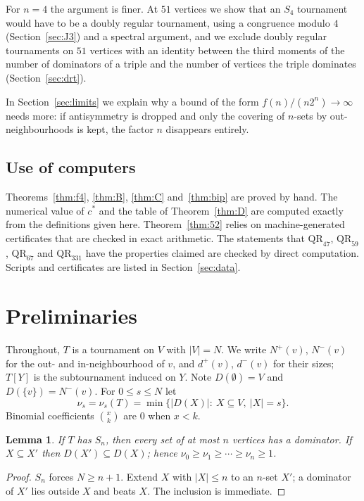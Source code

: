 \documentclass[11pt]{amsart}
\newtheorem{lemma}[theorem]{Lemma}
\theoremstyle{definition}
\theoremstyle{remark}
\newcommand{\D}{D}
\newcommand{\Nin}{N^{-}}
\newcommand{\Nout}{N^{+}}
\newcommand{\din}{d^{-}}
\newcommand{\dout}{d^{+}}
\newcommand{\QR}{\mathrm{QR}}
\newcommand{\cs}{c^{*}}
\newcommand{\abs}[1]{\lvert #1\rvert}
\begin{document}
For $n=4$ the argument is finer. At $51$ vertices we show that an $S_4$ tournament would have to be a doubly regular tournament,
using a congruence modulo $4$ (Section~\ref{sec:J3}) and a spectral argument, and we exclude doubly regular tournaments on $51$
vertices with an identity between the third moments of the number of dominators of a triple and the number of vertices the
triple dominates (Section~\ref{sec:drt}).

In Section~\ref{sec:limits} we explain why a bound of the form $f(n)/(n2^n)\to\infty$ needs more: if antisymmetry is dropped and
only the covering of $n$-sets by out-neighbourhoods is kept, the factor $n$ disappears entirely.

\subsection{Use of computers}
Theorems~\ref{thm:f4}, \ref{thm:B}, \ref{thm:C} and~\ref{thm:bip} are proved by hand. The numerical value of $\cs$ and the table
of Theorem~\ref{thm:D} are computed exactly from the definitions given here. Theorem~\ref{thm:52} relies on machine-generated
certificates that are checked in exact arithmetic. The statements that $\QR_{47}$, $\QR_{59}$, $\QR_{67}$ and $\QR_{331}$ have the
properties claimed are checked by direct computation. Scripts and certificates are listed in Section~\ref{sec:data}.

\section{Preliminaries}\label{sec:prelim}

Throughout, $T$ is a tournament on $V$ with $\abs{V}=N$. We write $\Nout(v)$, $\Nin(v)$ for the out- and in-neighbourhood of $v$, and
$\dout(v)$, $\din(v)$ for their sizes; $T[Y]$ is the subtournament induced on $Y$. Note $\D(\emptyset)=V$ and $\D(\{v\})=\Nin(v)$.
For $0\le s\le N$ let
\[
  \nu_s=\nu_s(T)=\min\{\abs{\D(X)}:\ X\subseteq V,\ \abs{X}=s\}.
\]
Binomial coefficients $\binom{x}{k}$ are $0$ when $x<k$.

\begin{lemma}\label{lem:hered}
If $T$ has $S_n$, then every set of at most $n$ vertices has a dominator. If $X\subseteq X'$ then $\D(X')\subseteq \D(X)$; hence
$\nu_0\ge\nu_1\ge\cdots\ge\nu_n\ge 1$.
\end{lemma}

\begin{proof}
$S_n$ forces $N\ge n+1$. Extend $X$ with $\abs{X}\le n$ to an $n$-set $X'$; a dominator of $X'$ lies outside $X$ and beats $X$.
The inclusion is immediate.
\end{proof}
\end{document}
